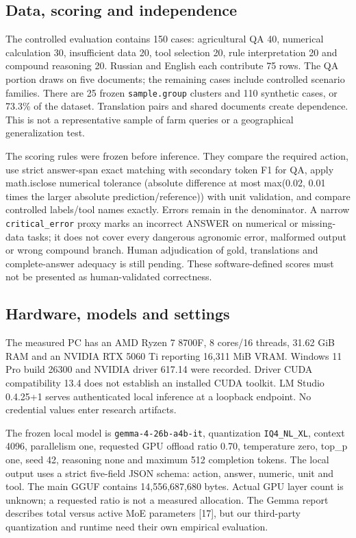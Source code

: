 \documentclass[10pt,a4paper,twocolumn]{article}
\begin{document}
\subsection{Data, scoring and independence}

The controlled evaluation contains 150 cases: agricultural QA 40, numerical calculation 30, insufficient data 20, tool selection 20, rule interpretation 20 and compound reasoning 20. Russian and English each contribute 75 rows. The QA portion draws on five documents; the remaining cases include controlled scenario families. There are 25 frozen \texttt{sample.group} clusters and 110 synthetic cases, or 73.3\% of the dataset. Translation pairs and shared documents create dependence. This is not a representative sample of farm queries or a geographical generalization test.

The scoring rules were frozen before inference. They compare the required action, use strict answer-span exact matching with secondary token F1 for QA, apply math.isclose numerical tolerance (absolute difference at most max(0.02, 0.01 times the larger absolute prediction/reference)) with unit validation, and compare controlled labels/tool names exactly. Errors remain in the denominator. A narrow \texttt{critical\_error} proxy marks an incorrect ANSWER on numerical or missing-data tasks; it does not cover every dangerous agronomic error, malformed output or wrong compound branch. Human adjudication of gold, translations and complete-answer adequacy is still pending. These software-defined scores must not be presented as human-validated correctness.

\subsection{Hardware, models and settings}

The measured PC has an AMD Ryzen 7 8700F, 8 cores/16 threads, 31.62 GiB RAM and an NVIDIA RTX 5060 Ti reporting 16,311 MiB VRAM. Windows 11 Pro build 26300 and NVIDIA driver 617.14 were recorded. Driver CUDA compatibility 13.4 does not establish an installed CUDA toolkit. LM Studio 0.4.25+1 serves authenticated local inference at a loopback endpoint. No credential values enter research artifacts.

The frozen local model is \texttt{gemma-4-26b-a4b-it}, quantization \texttt{IQ4\_NL\_XL}, context 4096, parallelism one, requested GPU offload ratio 0.70, temperature zero, top\_p one, seed 42, reasoning none and maximum 512 completion tokens. The local output uses a strict five-field JSON schema: action, answer, numeric, unit and tool. The main GGUF contains 14,556,687,680 bytes. Actual GPU layer count is unknown; a requested ratio is not a measured allocation. The Gemma report describes total versus active MoE parameters [17], but our third-party quantization and runtime need their own empirical evaluation.
\end{document}
